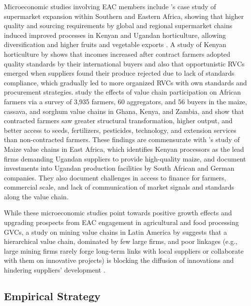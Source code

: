 \documentclass[a4paper]{article}
\begin{document}
Microeconomic studies involving EAC members include \citet{barrientos2016shifting}'s case study of supermarket expansion within Southern and Eastern Africa, showing that higher quality and sourcing requirements by global and regional supermarket chains induced improved processes in Kenyan and Ugandan horticulture, allowing diversification and higher fruits and vegetable exports \citep{world2020trading}. A study of Kenyan horticulture by \citet{krishnan2018origin} shows that incomes increased after contract farmers adopted quality standards by their international buyers and also that opportunistic RVCs emerged when suppliers found their produce rejected due to lack of standards compliance, which gradually led to more organized RVCs with own standards and procurement strategies. \citet{dihel2018does} study the effects of value chain participation on African farmers via a survey of 3,935 farmers, 60 aggregators, and 56 buyers in the maize, cassava, and sorghum value chains in Ghana, Kenya, and Zambia, and show that contracted farmers saw greater structural transformation, higher output, and better access to seeds, fertilizers, pesticides, technology, and extension services than non-contracted farmers. These findings are commensurate with \citet{daly2016maize}'s study of Maize value chains in East Africa, which identifies Kenyan processors as the lead firms demanding Ugandan suppliers to provide high-quality maize, and document investments into Ugandan production facilities by South African and German companies. They also document challenges in access to finance for farmers, commercial scale, and lack of communication of market signals and standards along the value chain.    \newline

While these microeconomic studies point towards positive growth effects and upgrading prospects from EAC  engagement in agricultural and food processing GVCs, a study on mining value chains in Latin America by \citet{pietrobelli2018innovation} suggests that a hierarchical value chain, dominated by few large firms, and poor linkages (e.g., large mining firms rarely forge long-term links with local suppliers or collaborate with them on innovative projects) is blocking the diffusion of innovations and hindering suppliers' development \citep{pietrobelli2018innovation, world2020trading}. 



\subsection{Empirical Strategy}
\end{document}
